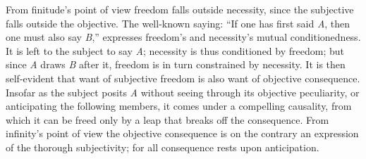 \documentclass[12pt]{book}
\begin{document}
From finitude's point of view freedom falls outside necessity, since the
subjective falls outside the objective. The well-known saying: ``If one has
first said \textit{A}, then one must also say \textit{B},'' expresses
freedom's and necessity's mutual conditionedness. It is left to the subject
to say \textit{A}; necessity is thus conditioned by freedom; but since
\textit{A} draws \textit{B} after it, freedom is in turn constrained by
necessity. It is then self-evident that want of subjective freedom is also
want of objective consequence. Insofar as the subject posits \textit{A}
without seeing through its objective peculiarity, or anticipating the
following members, it comes under a compelling causality, from which it can
be freed only by a leap that breaks off the consequence. From infinity's
point of view the objective consequence is on the contrary an expression of
the thorough subjectivity; for all consequence rests upon anticipation.
\end{document}

